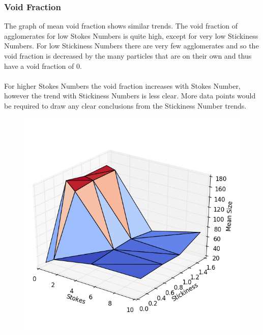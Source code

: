 \documentclass[a4paper,11pt,titlepage]{report}
\begin{document}
\subsubsection{Void Fraction}
The graph of mean void fraction shows similar trends. The void fraction of agglomerates for low Stokes Numbers is quite high, except for very low Stickiness Numbers. For low Stickiness Numbers there are very few agglomerates and so the void fraction is decreased by the many particles that are on their own and thus have a void fraction of 0.
\\\\For higher Stokes Numbers the void fraction increases with Stokes Number, however the trend with Stickiness Numbers is less clear. More data points would be required to draw any clear conclusions from the Stickiness Number trends.
\begin{figure}[!htb]
\centering
\includegraphics[scale=0.5]{figures/analysis/mean_size_3d.png}

\end{figure}
\end{document}

